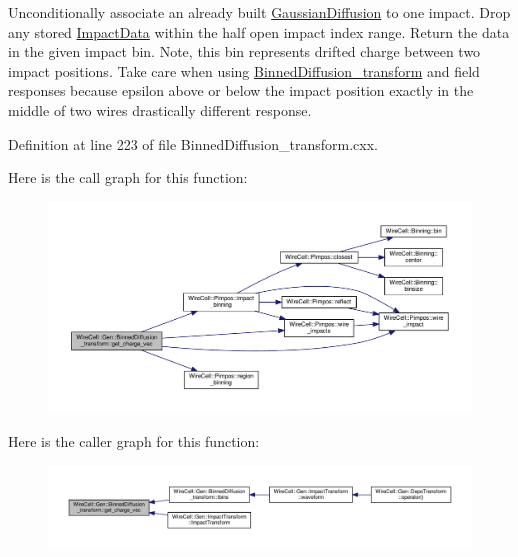Unconditionally associate an already built \hyperlink{class_wire_cell_1_1_gen_1_1_gaussian_diffusion}{Gaussian\+Diffusion} to one impact. Drop any stored \hyperlink{class_wire_cell_1_1_gen_1_1_impact_data}{Impact\+Data} within the half open impact index range. Return the data in the given impact bin. Note, this bin represents drifted charge between two impact positions. Take care when using \hyperlink{class_wire_cell_1_1_gen_1_1_binned_diffusion__transform}{Binned\+Diffusion\+\_\+transform} and field responses because epsilon above or below the impact position exactly in the middle of two wires drastically different response. 

Definition at line 223 of file Binned\+Diffusion\+\_\+transform.\+cxx.

Here is the call graph for this function\+:
\nopagebreak
\begin{figure}[H]
\begin{center}
\leavevmode
\includegraphics[width=350pt]{class_wire_cell_1_1_gen_1_1_binned_diffusion__transform_acb9922e051d067601b96fa03e80445bc_cgraph}
\end{center}
\end{figure}
Here is the caller graph for this function\+:
\nopagebreak
\begin{figure}[H]
\begin{center}
\leavevmode
\includegraphics[width=350pt]{class_wire_cell_1_1_gen_1_1_binned_diffusion__transform_acb9922e051d067601b96fa03e80445bc_icgraph}
\end{center}
\end{figure}
\mbox{\label{class_wire_cell_1_1_gen_1_1_binned_diffusion__transform_a34dcb68c70dcf99ff252e36442f4bce8}} 
